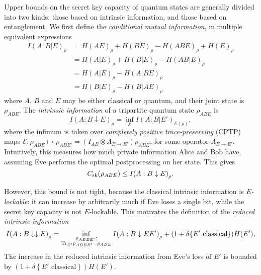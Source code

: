 \documentclass[10pt, a4paper]{article}
\numberwithin{equation}{section} %
\theoremstyle{definition}
\theoremstyle{plain}
\newcommand{\?}{\mathrel{?}} %
\newcommand{\indic}[1]{\delta{\left\{#1\right\}}} %
\newcommand{\Tr}{\mathrm{Tr}} %
\newcommand{\cE}{\mathcal{E}}
\newcommand{\sk}{\rm sk}
\begin{document}
      Upper bounds on the secret key capacity of quantum states are generally divided into two kinds: those based on intrinsic information, and those based on entanglement. We first define the \emph{conditional mutual information}, in multiple equivalent expressions
      \begin{align}
        I{(A:B|E)}_{\rho} &= H{(AE)}_{\rho} + H{(BE)}_{\rho} - H{(ABE)}_{\rho} + H{(E)}_{\rho} \\
                          &= H{(A|E)}_{\rho} + H{(B|E)}_{\rho} - H{(AB|E)}_{\rho} \\
                          &= H{(A|E)}_{\rho} - H{(A|BE)}_{\rho} \\
                          &= H{(B|E)}_{\rho} - H{(B|AE)}_{\rho}
      \end{align}
      where \(A\), \(B\) and \(E\) may be either classical or quantum, and their joint state is \(\rho_{ABE}\). The \emph{intrinsic information} of a tripartite quantum state \(\rho_{A B E}\) is
      \begin{equation}
        I{(A : B \downarrow E)}_{\rho} = \inf_{\cE} I{(A : B|E')}_{\cE(\rho)},
      \end{equation}
      where the infimum is taken over \emph{completely positive trace-preserving} (CPTP) maps \(\cE : \rho_{A B E} \mapsto \rho_{A B E'} = \left(I_{A B} \otimes \Lambda_{E \to E'}\right) \rho_{A B E}\), for some operator \(\Lambda_{E \to E'}\). Intuitively, this measures how much private information Alice and Bob have, assuming Eve performs the optimal postprocessing on her state. This gives
      \begin{equation}
        C_{\sk}(\rho_{A B E}) \leq I{(A : B \downarrow E)}_{\rho}.
      \end{equation}

      However, this bound is not tight, because the classical intrinsic information is \emph{\(E\)-lockable}: it can increase by arbitrarily much if Eve loses a single bit, while the secret key capacity is not \(E\)-lockable. This motivates the definition of the \emph{reduced intrinsic information}
      \begin{equation}\label{eqn:red_intr_info}
        I{(A : B \downarrow\downarrow E)}_{\rho} = \inf_{%
        \substack{\rho_{A B EE'} : \\ 
        \Tr_{E'} \rho_{A B EE'} = \rho_{A B E}}}
        I{(A : B \downarrow EE')}_{\rho} + (1+\indic{E' \text{ classical}})H(E'),
      \end{equation}
      The increase in the reduced intrinsic information from Eve's loss of \(E'\) is bounded by \((1+\indic{E' \text{ classical}})H(E')\).
\end{document}
